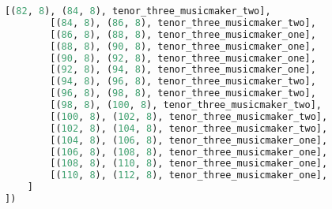 \begin{lstlisting}[language=Python, caption=Invocation Source Code]
        [(82, 8), (84, 8), tenor_three_musicmaker_two],
        [(84, 8), (86, 8), tenor_three_musicmaker_two],
        [(86, 8), (88, 8), tenor_three_musicmaker_one],
        [(88, 8), (90, 8), tenor_three_musicmaker_one],
        [(90, 8), (92, 8), tenor_three_musicmaker_one],
        [(92, 8), (94, 8), tenor_three_musicmaker_one],
        [(94, 8), (96, 8), tenor_three_musicmaker_two],
        [(96, 8), (98, 8), tenor_three_musicmaker_two],
        [(98, 8), (100, 8), tenor_three_musicmaker_two],
        [(100, 8), (102, 8), tenor_three_musicmaker_two],
        [(102, 8), (104, 8), tenor_three_musicmaker_two],
        [(104, 8), (106, 8), tenor_three_musicmaker_one],
        [(106, 8), (108, 8), tenor_three_musicmaker_one],
        [(108, 8), (110, 8), tenor_three_musicmaker_one],
        [(110, 8), (112, 8), tenor_three_musicmaker_one],
    ]
])


\end{lstlisting}
